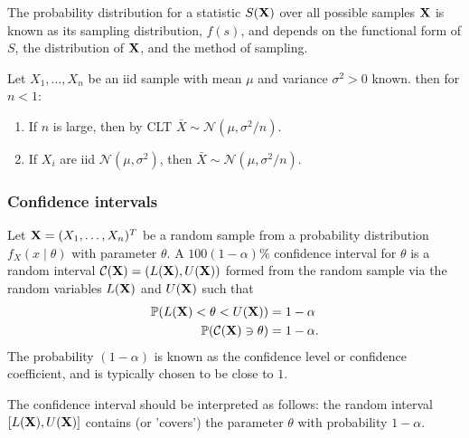 \documentclass[10pt, a4paper]{article}
\begin{document}
\begin{definition}
    The probability distribution for a statistic $S(\mathbf{X})$ over all possible samples $\mathbf{X}$ is known as its sampling distribution,
    $f(s)$,
    and depends on the functional form of $S$,
    the distribution of $\mathbf{X}$,
    and the method of sampling.
\end{definition}

\begin{theorem}
    Let $X_1, \dotsc, X_n$ be an iid sample with mean $\mu$ and variance $\sigma ^ 2 > 0$ known.
    then for $n < 1$:

    \begin{enumerate}[label = \arabic*.]
        \item If $n$ is large,
        then by CLT $\bar{X} \sim \mathcal{N}(\mu, \sigma ^ 2 / n)$.

        \item If $X_i$ are iid $\mathcal{N}(\mu, \sigma ^ 2)$,
        then $\bar{X} \sim \mathcal{N}(\mu, \sigma ^ 2 / n)$.
    \end{enumerate}
\end{theorem}

\subsubsection{Confidence intervals}

\begin{definition}
    Let $\mathbf{X} = (X_1, \dotsc, X_n) ^ T$ be a random sample from a probability distribution $f_X(x \mid \theta)$ with parameter $\theta$.
    A $100(1 - \alpha)\%$ confidence interval for $\theta$ is a random interval $\mathcal{C}(\mathbf{X}) = (L(\mathbf{X}), U(\mathbf{X}))$ formed from the random sample via the random variables $L(\mathbf{X})$ and $U(\mathbf{X})$ such that
    \begin{align*}
        \mathbb{P}(L(\mathbf{X}) < \theta < U(\mathbf{X})) &= 1 - \alpha \\
        \mathbb{P}(\mathcal{C}(\mathbf{X}) \ni \theta) &= 1 - \alpha.
    \end{align*}
    The probability $(1 - \alpha)$ is known as the confidence level or confidence coefficient,
    and is typically chosen to be close to $1$.
\end{definition}

The confidence interval should be interpreted as follows:
the random interval $[L(\mathbf{X}), U(\mathbf{X})]$ contains
(or 'covers')
the parameter $\theta$ with probability $1 - \alpha$.
\end{document}
